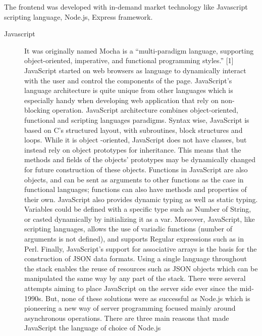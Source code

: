 The frontend was developed with in-demand market technology like Javascript scripting language, Node.js, Express framework.

\begin{description}
    \item[Javascript] It was originally named Mocha is a “multi-paradigm language, supporting object-oriented, imperative, and functional programming styles.” [1] JavaScript started on web browsers as language to dynamically interact with the user and control the components of the page. JavaScript’s language architecture is quite unique from other languages which is especially handy when developing web application that rely on non-blocking operation.
    \newline
    \newline
    JavaScript architecture combines object-oriented, functional and scripting languages paradigms. Syntax wise, JavaScript is based on C’s structured layout, with subroutines, block structures and loops. While it is object
    -oriented, JavaScript does not have classes, but instead
    rely on object prototypes for inheritance. This means that the methods and fields of the objects’ prototypes may be dynamically changed for future construction of these objects. Functions in JavaScript are also objects, and can be sent as arguments to other functions as the case in
    functional languages; functions can also have methods and properties of their own. JavaScript also provides dynamic typing as well as static typing. Variables could be defined with a specific type such as Number of String, or casted dynamically by initializing it as a var. Moreover, JavaScript, like scripting languages, allows the use of variadic functions (number of arguments is not defined), and supports Regular expressions such as in Perl. Finally, JavaScript’s support for associative arrays is the basis for the construction of JSON data formats. Using a single language throughout the stack enables the reuse of resources such as JSON objects which can be manipulated the same way by any part of the stack.
    \newline
    \newline
    There were several attempts aiming to place JavaScript on the server side ever since the mid-1990s. But, none of these solutions were as successful as Node.js which is pioneering a new way of server programming focused mainly around asynchronous operations. There are three
    main reasons that made JavaScript the language of choice of Node.js
    \begin{enumerate}

\end{enumerate}
\end{description}
